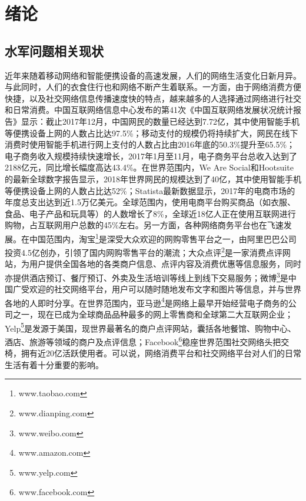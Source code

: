 
\chapter{绪论}
\label{chap:intro}

\section{水军问题相关现状}

近年来随着移动网络和智能便携设备的高速发展，人们的网络生活变化日新月异。与此同时，人们的衣食住行也和网络不断产生着联系。一方面，由于网络消费方便快捷，以及社交网络信息传播速度快的特点，越来越多的人选择通过网络进行社交和日常消费。中国互联网络信息中心发布的第41次《中国互联网络发展状况统计报告》显示：截止2017年12月，中国网民的数量已经达到7.72亿，其中使用智能手机等便携设备上网的人数占比达97.5\%；移动支付的规模仍将持续扩大，网民在线下消费时使用智能手机进行网上支付的人数占比由2016年底的50.3\%提升至65.5\%；电子商务收入规模持续快速增长，2017年1月至11月，电子商务平台总收入达到了2188亿元，同比增长幅度高达43.4\%。在世界范围内，We Are Social和Hootsuite的最新全球数字报告显示，2018年世界网民的规模达到了40亿，其中使用智能手机等便携设备上网的人数占比达52\%；Statista最新数据显示，2017年的电商市场的年度总支出达到近1.5万亿美元。全球范围内，使用电商平台购买商品（如衣服、食品、电子产品和玩具等）的人数增长了8\%，全球近18亿人正在使用互联网进行购物，占互联网用户总数的45\%左右。另一方面，各种网络商务平台也在飞速发展。在中国范围内，淘宝\footnote{www.taobao.com}是深受大众欢迎的网购零售平台之一，由阿里巴巴公司投资4.5亿创办，引领了国内网购零售平台的潮流；大众点评\footnote{www.dianping.com}是一家消费点评网站，为用户提供全国各地的各类商户信息、点评内容及消费优惠等信息服务，同时亦提供酒店预订、餐厅预订、外卖及生活培训等线上到线下交易服务；微博\footnote{www.weibo.com}是中国广受欢迎的社交网络平台，用户可以随时随地发布文字和图片等信息，并与世界各地的人即时分享。在世界范围内，亚马逊\footnote{www.amazon.com}是网络上最早开始经营电子商务的公司之一，现在已成为全球商品品种最多的网上零售商和全球第二大互联网企业；Yelp\footnote{www.yelp.com}是发源于美国，现世界最著名的商户点评网站，囊括各地餐馆、购物中心、酒店、旅游等领域的商户及点评信息；Facebook\footnote{www.facebook.com}稳座世界范围社交网络头把交椅，拥有近20亿活跃使用者。可以说，网络消费平台和社交网络平台对人们的日常生活有着十分重要的影响。

